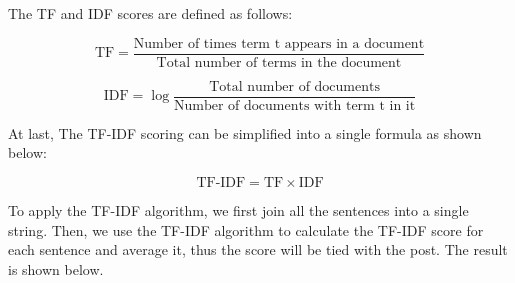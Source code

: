 The TF and IDF scores are defined as follows:

\begin{equation}
\label{eq:tf}
\text{TF} = \frac{\text{Number of times term t appears in a document}}{\text{Total number of terms in the document}}
\end{equation}

\begin{equation}
\label{eq:idf}
\text{IDF} = \log{\frac{\text{Total number of documents}}{\text{Number of documents with term t in it}}}
\end{equation}

At last, The TF-IDF scoring can be simplified into a single formula as shown below:

\begin{equation}
\label{eq:tfidf}
\text{TF-IDF} = \text{TF} \times \text{IDF}
\end{equation}

To apply the TF-IDF algorithm, we first join all the sentences into a single string. Then, we use the TF-IDF algorithm to calculate the TF-IDF score for each sentence and average it, thus the score will be tied with the post. The result is shown below.

